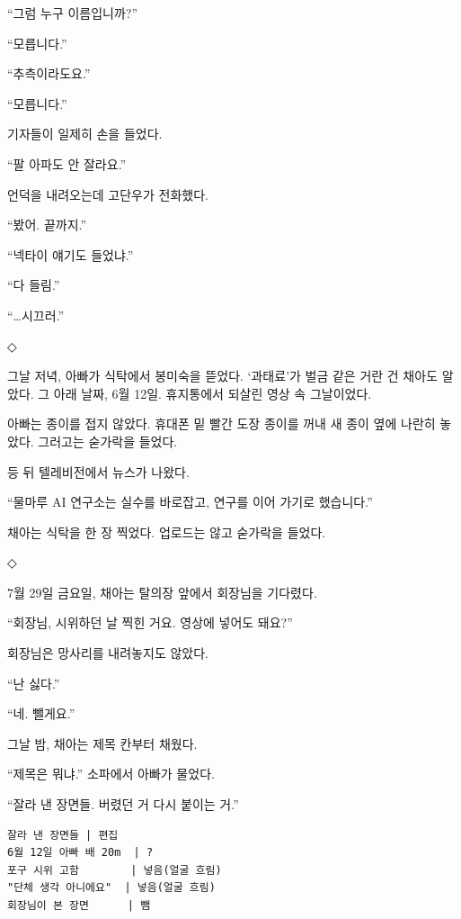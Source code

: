 \documentclass[
  korean,
  letterpaper,
  twoside,
  open=any,
  fontsize=12.5pt,
  headings=small]{scrbook}
\newcommand{\logfont}{\linespread{1}\fontsize{10.8}{15.2}\selectfont}
\begin{document}
``그럼 누구 이름입니까?''

``모릅니다.''

``추측이라도요.''

``모릅니다.''

기자들이 일제히 손을 들었다.

``팔 아파도 안 잘라요.''

언덕을 내려오는데 고단우가
전화했다.

``봤어. 끝까지.''

``넥타이 얘기도 들었냐.''

``다 들림.''

``\ldots 시끄러.''

\begin{center}◇\end{center}\nopagebreak

그날 저녁, 아빠가 식탁에서
봉미숙을 뜯었다. `과태료'가
벌금 같은 거란 건 채아도
알았다. 그 아래 날짜, 6월
12일. 휴지통에서 되살린 영상
속 그날이었다.

아빠는 종이를 접지 않았다.
휴대폰 밑 빨간 도장 종이를
꺼내 새 종이 옆에 나란히
놓았다. 그러고는 숟가락을
들었다.

등 뒤 텔레비전에서 뉴스가
나왔다.

``물마루 AI 연구소는 실수를
바로잡고, 연구를 이어 가기로
했습니다.''

채아는 식탁을 한 장 찍었다.
업로드는 않고 숟가락을 들었다.

\begin{center}◇\end{center}\nopagebreak

7월 29일 금요일, 채아는 탈의장
앞에서 회장님을 기다렸다.

``회장님, 시위하던 날 찍힌
거요. 영상에 넣어도 돼요?''

회장님은 망사리를 내려놓지도
않았다.

``난 싫다.''

``네. 뺄게요.''

그날 밤, 채아는 제목 칸부터
채웠다.

``제목은 뭐냐.'' 소파에서
아빠가 물었다.

``잘라 낸 장면들. 버렸던 거
다시 붙이는 거.''

\begin{Verbatim}[samepage=true,frame=single,framesep=2.5mm,rulecolor=\color{gray},formatcom=\logfont]
잘라 낸 장면들 | 편집
6월 12일 아빠 배 20m  | ?
포구 시위 고함        | 넣음(얼굴 흐림)
"단체 생각 아니에요"  | 넣음(얼굴 흐림)
회장님이 본 장면      | 뺌
\end{Verbatim}
\end{document}
